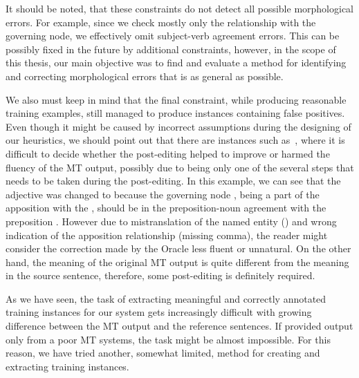 It should be noted, that these constraints do not detect all possible morphological errors. For example,
since we check mostly only the relationship with the governing node, we effectively omit subject-verb
agreement errors. This can be possibly
fixed in the future by additional constraints, however, in the scope of this thesis, our main objective was
to find and evaluate a method for identifying and correcting morphological errors that is as general as possible.

We also must keep in mind that the final constraint, while producing reasonable training examples,
still managed to produce instances containing false positives. Even though it might be caused by
incorrect assumptions during the designing of our heuristics, we should point out that there
are instances such as~, where it is difficult to decide whether the post-editing
helped to improve or harmed the fluency of the MT output, possibly due to being only one of the
several steps that needs to be taken during the post-editing.
In this example, we can see that the adjective  was changed to  because the
governing node , being a part of the apposition with the , should
be in the preposition-noun agreement with the preposition . However due to mistranslation of the
named entity () and wrong indication of the apposition relationship (missing comma),
the reader might consider the correction made by the Oracle less fluent or unnatural. On the other hand,
the meaning of the original MT output is quite different from the meaning in the source sentence, therefore,
some post-editing is definitely required.

As we have seen, the task of extracting meaningful and correctly annotated training instances for our system
 gets increasingly difficult with growing difference between the MT output and the reference sentences.
If provided output only from a poor MT systems, the task might be almost impossible. For this reason,
we have tried another, somewhat limited, method for creating and extracting training instances.

